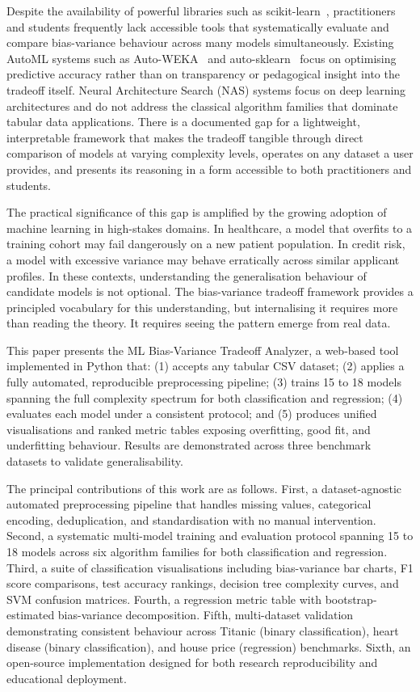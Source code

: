\documentclass[conference]{IEEEtran}
\begin{document}
Despite the availability of powerful libraries such as scikit-learn~\cite{b3}, practitioners and students frequently lack accessible tools that systematically evaluate and compare bias-variance behaviour across many models simultaneously. Existing AutoML systems such as Auto-WEKA~\cite{b4} and auto-sklearn~\cite{b5} focus on optimising predictive accuracy rather than on transparency or pedagogical insight into the tradeoff itself. Neural Architecture Search (NAS) systems focus on deep learning architectures and do not address the classical algorithm families that dominate tabular data applications. There is a documented gap for a lightweight, interpretable framework that makes the tradeoff tangible through direct comparison of models at varying complexity levels, operates on any dataset a user provides, and presents its reasoning in a form accessible to both practitioners and students.

The practical significance of this gap is amplified by the growing adoption of machine learning in high-stakes domains. In healthcare, a model that overfits to a training cohort may fail dangerously on a new patient population. In credit risk, a model with excessive variance may behave erratically across similar applicant profiles. In these contexts, understanding the generalisation behaviour of candidate models is not optional. The bias-variance tradeoff framework provides a principled vocabulary for this understanding, but internalising it requires more than reading the theory. It requires seeing the pattern emerge from real data.

This paper presents the ML Bias-Variance Tradeoff Analyzer, a web-based tool implemented in Python that: (1) accepts any tabular CSV dataset; (2) applies a fully automated, reproducible preprocessing pipeline; (3) trains 15 to 18 models spanning the full complexity spectrum for both classification and regression; (4) evaluates each model under a consistent protocol; and (5) produces unified visualisations and ranked metric tables exposing overfitting, good fit, and underfitting behaviour. Results are demonstrated across three benchmark datasets to validate generalisability.

The principal contributions of this work are as follows. First, a dataset-agnostic automated preprocessing pipeline that handles missing values, categorical encoding, deduplication, and standardisation with no manual intervention. Second, a systematic multi-model training and evaluation protocol spanning 15 to 18 models across six algorithm families for both classification and regression. Third, a suite of classification visualisations including bias-variance bar charts, F1 score comparisons, test accuracy rankings, decision tree complexity curves, and SVM confusion matrices. Fourth, a regression metric table with bootstrap-estimated bias-variance decomposition. Fifth, multi-dataset validation demonstrating consistent behaviour across Titanic (binary classification), heart disease (binary classification), and house price (regression) benchmarks. Sixth, an open-source implementation designed for both research reproducibility and educational deployment.
\end{document}
